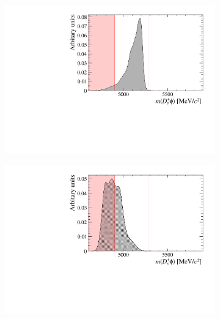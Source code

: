 \begin{figure}[!h]
    \centering
    \begin{subfigure}[t]{0.49\textwidth}
        \includegraphics[width=1.0\textwidth]{figs/B2DsPhi/Bs2Dsa1_4600_5900_Shape.pdf}
        \caption{\decay{\Bsb}{\Dsp} }
    \end{subfigure}
    \begin{subfigure}[t]{0.49\textwidth}
        \includegraphics[width=1.0\textwidth]{figs/B2DsPhi/Bs2DsstKKst_4600_5900_Shape.pdf}
        \caption{\decay{\Bsb}{\Dsp\Kstar\Kp} }
    \end{subfigure}
    \begin{subfigure}[t]{0.49\textwidth}

\end{subfigure}
\end{figure}
